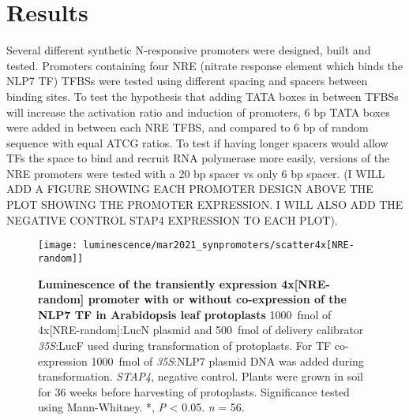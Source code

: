 \documentclass[../main.tex]{subfiles}
\begin{document}
\section{Results}\label{chapter5:results}

Several different synthetic N\hyp{}responsive promoters were designed, built and tested.
Promoters containing four NRE (nitrate response element which binds the NLP7 TF) TFBSs were tested using different spacing and spacers between binding sites.
To test the hypothesis that adding TATA boxes in between TFBSs will increase the activation ratio and induction of promoters, 6 bp TATA boxes were added in between each NRE TFBS, and compared to 6 bp of random sequence with equal ATCG ratios.
To test if having longer spacers would allow TFs the space to bind and recruit RNA polymerase more easily, versions of the NRE promoters were tested with a 20 bp spacer vs only 6 bp spacer.
(I WILL ADD A FIGURE SHOWING EACH PROMOTER DESIGN ABOVE THE PLOT SHOWING THE PROMOTER EXPRESSION. I WILL ALSO ADD THE NEGATIVE CONTROL STAP4 EXPRESSION TO EACH PLOT).
\begin{figure}[hbt!]
	\begin{center}
		\capstart
		\texttt{[image: luminescence/mar2021\_synpromoters/scatter4x[NRE-random]]}
		\caption{
			\textbf{Luminescence of the transiently expression 4x[NRE-random] promoter with or without co\hyp{}expression of the NLP7 TF in Arabidopsis leaf protoplasts}
			\SI{1000}{\fmol} of 4x[NRE-random]:LucN plasmid and \SI{500}{\fmol} of delivery calibrator \textit{35S}:LucF used during transformation of protoplasts.
			For TF co\hyp{}expression \SI{1000}{\fmol} of \textit{35S}:NLP7 plasmid DNA was added during transformation.
			\textit{STAP4}, negative control.
			Plants were grown in soil for 3\textendash{}6 weeks before harvesting of protoplasts.
			Significance tested using Mann-Whitney.
			*, \textit{P} \textless{} 0.05.
			\textit{n} = 5\textendash{}6.
			\label{fig:4xnre-random}
		}
	\end{center}
\end{figure}
\end{document}
